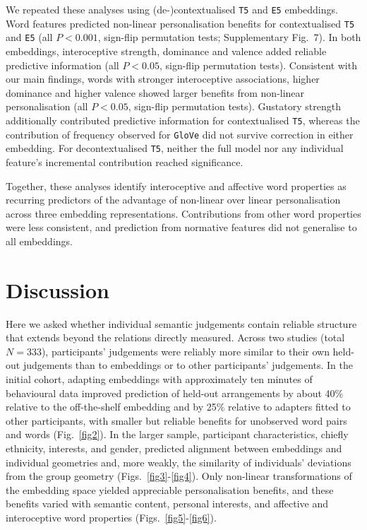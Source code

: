 \documentclass[pdflatex,sn-mathphys]{sn-jnl}
\begin{document}
We repeated these analyses using (de-)contextualised \texttt{T5} and \texttt{E5} embeddings. Word features predicted non-linear personalisation benefits for contextualised \texttt{T5} and \texttt{E5} (all $P < 0.001$, sign-flip permutation tests; Supplementary Fig.~7). In both embeddings, interoceptive strength, dominance and valence added reliable predictive information (all $P < 0.05$, sign-flip permutation tests). Consistent with our main findings, words with stronger interoceptive associations, higher dominance and higher valence showed larger benefits from non-linear personalisation (all $P < 0.05$, sign-flip permutation tests). Gustatory strength additionally contributed predictive information for contextualised \texttt{T5}, whereas the contribution of frequency observed for \texttt{GloVe} did not survive correction in either embedding. For decontextualised \texttt{T5}, neither the full model nor any individual feature's incremental contribution reached significance.

Together, these analyses identify interoceptive and affective word properties as recurring predictors of the advantage of non-linear over linear personalisation across three embedding representations. Contributions from other word properties were less consistent, and prediction from normative features did not generalise to all embeddings.

\section{Discussion}\label{discussion}
Here we asked whether individual semantic judgements contain reliable structure that extends beyond the relations directly measured. Across two studies (total $N = 333$), participants' judgements were reliably more similar to their own held-out judgements than to embeddings or to other participants' judgements. In the initial cohort, adapting embeddings with approximately ten minutes of behavioural data improved prediction of held-out arrangements by about 40\% relative to the off-the-shelf embedding and by 25\% relative to adapters fitted to other participants, with smaller but reliable benefits for unobserved word pairs and words (Fig.~\ref{fig2}). In the larger sample, participant characteristics, chiefly ethnicity, interests, and gender, predicted alignment between embeddings and individual geometries and, more weakly, the similarity of individuals' deviations from the group geometry (Figs.~\ref{fig3}-\ref{fig4}). Only non-linear transformations of the embedding space yielded appreciable personalisation benefits, and these benefits varied with semantic content, personal interests, and affective and interoceptive word properties (Figs.~\ref{fig5}-\ref{fig6}).
\end{document}
